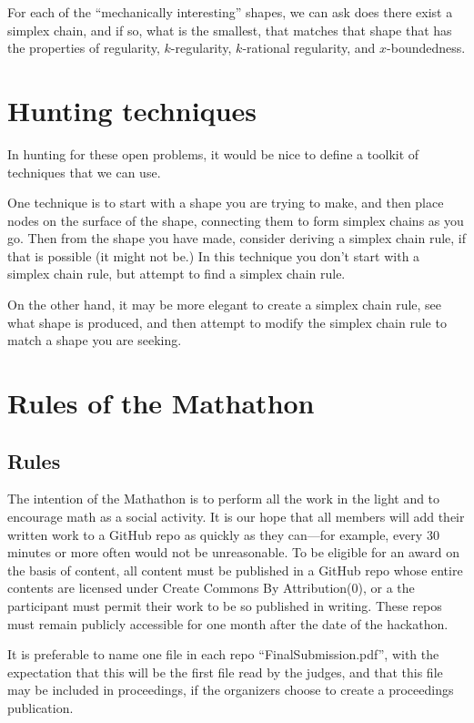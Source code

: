 \documentclass[11pt]{article}
\begin{document}
For each of the ``mechanically interesting'' shapes, we can ask does there exist a simplex chain,
and if so, what is the smallest,
that matches that shape that has the properties of regularity, $k$-regularity, $k$-rational regularity, and $x$-boundedness. 

\section{Hunting techniques}

In hunting for these open problems, it would be nice to define a toolkit of techniques that we can use.

One technique is to start with a shape you are trying to make, and then place nodes on the surface of the shape,
connecting them to form simplex chains as you go. Then from the shape you have made, consider deriving a simplex chain rule,
if that is possible (it might not be.) In this technique you don't start with a simplex chain rule, but
attempt to find a simplex chain rule.

On the other hand, it may be more elegant to create a simplex chain rule, see what shape is produced,
and then attempt to modify the simplex chain rule to match a shape you are seeking.

\section{Rules of the Mathathon}

\subsection{Rules}

The intention of the Mathathon is to perform all the work in the light and to encourage math
as a social activity.
It is our hope that all members will add their written work to a GitHub repo as quickly
as they can---for example, every 30 minutes or more often would not be unreasonable.
To be eligible for an award on the basis of content, all content must be published in a GitHub repo
whose entire contents are licensed under Create Commons By Attribution(0), or a the
participant must permit their work to be so published in writing.
These repos must remain publicly accessible for one month after the date of the hackathon.

It is preferable to name one file in each repo ``FinalSubmission.pdf'', with the expectation that this
will be the first file read by the judges, and that this file may be included in proceedings, if the
organizers choose to create a proceedings publication.
\end{document}
